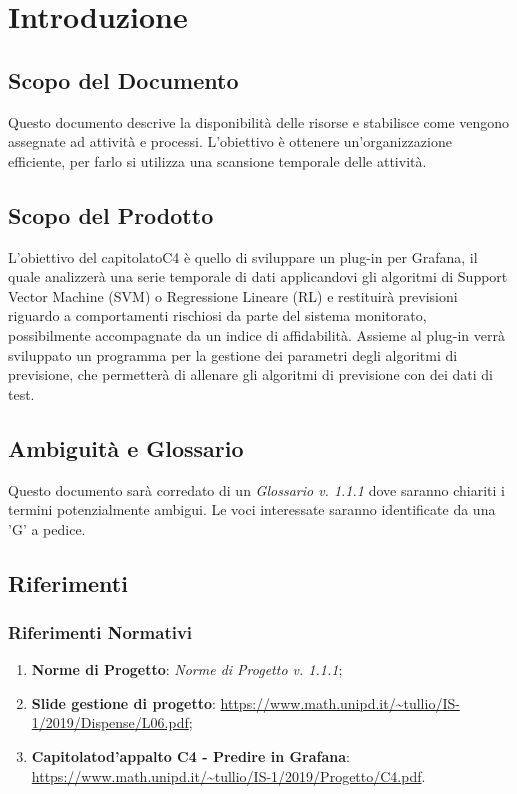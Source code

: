 \section{Introduzione}
	\subsection{Scopo del Documento}
		Questo documento descrive la disponibilità delle risorse e stabilisce come vengono assegnate ad attività e processi\glo. L'obiettivo è ottenere un'organizzazione efficiente, per farlo si utilizza una scansione temporale delle attività.
	\subsection{Scopo del Prodotto}
		L'obiettivo del capitolato\glosp C4 è quello di sviluppare un plug-in per Grafana\glo, il quale analizzerà una serie temporale di dati applicandovi gli algoritmi di Support Vector Machine (SVM\glo) o Regressione Lineare (RL\glo) e restituirà previsioni riguardo a comportamenti rischiosi da parte del sistema monitorato, possibilmente accompagnate da un indice di affidabilità. Assieme al plug-in verrà sviluppato un programma per la gestione dei parametri degli algoritmi di previsione, che permetterà di allenare gli algoritmi di previsione con dei dati di test.
	\subsection{Ambiguità e Glossario}
		Questo documento sarà corredato di un \textit{Glossario v. 1.1.1} dove saranno chiariti i termini potenzialmente ambigui.
		Le voci interessate saranno identificate da una 'G' a pedice.
	\subsection{Riferimenti}
		\subsubsection{Riferimenti Normativi}
			\begin{enumerate}
				\item \textbf{Norme di Progetto}: \textit{Norme di Progetto v. 1.1.1};
				\item \textbf{Slide gestione di progetto}: \url{https://www.math.unipd.it/~tullio/IS-1/2019/Dispense/L06.pdf};
				\item \textbf{Capitolato\glosp d'appalto C4 - Predire in Grafana}:  \url{https://www.math.unipd.it/~tullio/IS-1/2019/Progetto/C4.pdf}.
			\end{enumerate}

